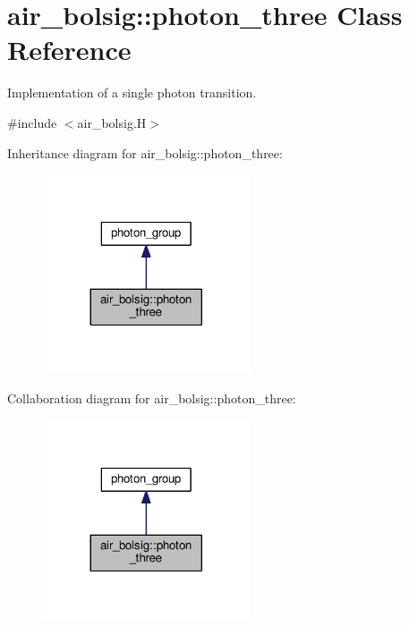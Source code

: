 \hypertarget{classair__bolsig_1_1photon__three}{}\section{air\+\_\+bolsig\+:\+:photon\+\_\+three Class Reference}
\label{classair__bolsig_1_1photon__three}


Implementation of a single photon transition.  




{\ttfamily \#include $<$air\+\_\+bolsig.\+H$>$}



Inheritance diagram for air\+\_\+bolsig\+:\+:photon\+\_\+three\+:\nopagebreak
\begin{figure}[H]
\begin{center}
\leavevmode
\includegraphics[width=173pt]{classair__bolsig_1_1photon__three__inherit__graph}
\end{center}
\end{figure}


Collaboration diagram for air\+\_\+bolsig\+:\+:photon\+\_\+three\+:\nopagebreak
\begin{figure}[H]
\begin{center}
\leavevmode
\includegraphics[width=173pt]{classair__bolsig_1_1photon__three__coll__graph}
\end{center}
\end{figure}
